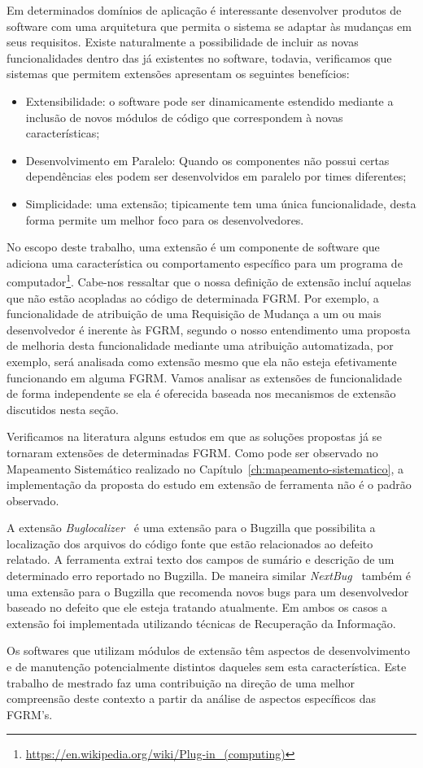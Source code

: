 Em determinados domínios de aplicação é interessante desenvolver produtos de
software com uma arquitetura que permita o sistema se adaptar às mudanças em
seus requisitos. Existe naturalmente a possibilidade de incluir as novas
funcionalidades dentro das já existentes no software, todavia, verificamos que
sistemas que permitem extensões apresentam os seguintes benefícios:

\begin{itemize}
	\item Extensibilidade: o software pode ser dinamicamente estendido mediante
		a inclusão de novos módulos de código que correspondem à novas
		características;
	\item Desenvolvimento em Paralelo: Quando os componentes não possui certas
		dependências eles podem ser desenvolvidos em paralelo por times
		diferentes;
	\item Simplicidade: uma  extensão; tipicamente tem uma única funcionalidade,
		desta forma permite um melhor foco para os desenvolvedores.
\end{itemize}

No escopo deste trabalho, uma extensão é um componente de software que adiciona
uma característica ou comportamento específico para um programa de
computador\footnote{\url{https://en.wikipedia.org/wiki/Plug-in_(computing)}}.
Cabe-nos ressaltar que o nossa definição de extensão incluí aquelas que não
estão acopladas ao código de determinada FGRM\@. Por exemplo, a funcionalidade
de atribuição de uma Requisição de Mudança a um ou mais desenvolvedor é inerente
às FGRM, segundo o nosso entendimento uma proposta de melhoria desta
funcionalidade mediante uma atribuição automatizada, por exemplo, será analisada
como extensão mesmo que ela não esteja efetivamente funcionando em alguma
FGRM\@. Vamos a\-na\-li\-sar as extensões de funcionalidade de forma
independente se ela é oferecida baseada nos mecanismos de extensão discutidos
nesta seção.

Verificamos na literatura alguns estudos em que as soluções propostas já se
tornaram extensões de determinadas FGRM. Como pode ser observado no Mapeamento
Sistemático realizado no Capítulo~\ref{ch:mapeamento-sistematico}, a
implementação da proposta do estudo em extensão de ferramenta não é o padrão
observado.

A extensão \textit{Buglocalizer}~\cite{Thung:2014:BIT:2635868.2661678} é uma
extensão para o Bugzilla que possibilita a localização dos arquivos do código
fonte que estão relacionados ao defeito relatado. A ferramenta extrai texto dos
campos de sumário e descrição de um determinado erro reportado no Bugzilla. De
maneira similar \textit{NextBug}~\cite{101186} também é uma extensão para o
Bugzilla que recomenda novos bugs para um desenvolvedor baseado no defeito que
ele esteja tratando atualmente. Em ambos os casos a extensão foi implementada
utilizando técnicas de Recuperação da Informação.

Os softwares que utilizam módulos de extensão têm aspectos de desenvolvimento e
de manutenção potencialmente distintos daqueles sem esta característica. Este
trabalho de mestrado faz uma contribuição na direção de uma melhor compreensão
deste contexto a partir da análise de aspectos específicos das FGRM's.
